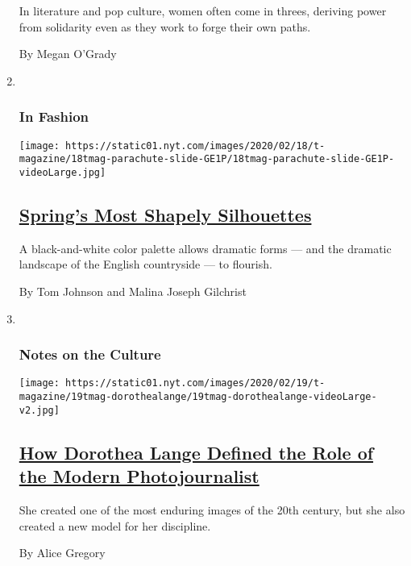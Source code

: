 \begin{enumerate}
  In literature and pop culture, women often come in threes, deriving
  power from solidarity even as they work to forge their own paths.

  By Megan O'Grady
\item ~
  \hypertarget{in-fashion-1}{%
  \subsubsection{In Fashion}\label{in-fashion-1}}

  \texttt{[image: https://static01.nyt.com/images/2020/02/18/t-magazine/18tmag-parachute-slide-GE1P/18tmag-parachute-slide-GE1P-videoLarge.jpg]}

  \hypertarget{springs-most-shapely-silhouettes}{%
  \subsection{\texorpdfstring{\href{/2020/02/18/t-magazine/spring-fashion-silhouettes.html}{Spring's
  Most Shapely
  Silhouettes}}{Spring's Most Shapely Silhouettes}}\label{springs-most-shapely-silhouettes}}

  A black-and-white color palette allows dramatic forms --- and the
  dramatic landscape of the English countryside --- to flourish.

  By Tom Johnson and Malina Joseph Gilchrist
\item ~
  \hypertarget{notes-on-the-culture}{%
  \subsubsection{Notes on the Culture}\label{notes-on-the-culture}}

  \texttt{[image: https://static01.nyt.com/images/2020/02/19/t-magazine/19tmag-dorothealange/19tmag-dorothealange-videoLarge-v2.jpg]}

  \hypertarget{how-dorothea-lange-defined-the-role-of-the-modern-photojournalist}{%
  \subsection{\texorpdfstring{\href{/2020/02/10/t-magazine/dorothea-lange.html}{How
  Dorothea Lange Defined the Role of the Modern
  Photojournalist}}{How Dorothea Lange Defined the Role of the Modern Photojournalist}}\label{how-dorothea-lange-defined-the-role-of-the-modern-photojournalist}}

  She created one of the most enduring images of the 20th century, but
  she also created a new model for her discipline.

  By Alice Gregory
\end{enumerate}

